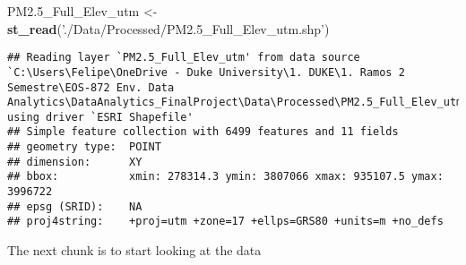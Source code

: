 \documentclass[12pt,]{article}
\newenvironment{Shaded}{\begin{snugshade}}{\end{snugshade}}
\newcommand{\KeywordTok}[1]{\textcolor[rgb]{0.13,0.29,0.53}{\textbf{#1}}}
\newcommand{\StringTok}[1]{\textcolor[rgb]{0.31,0.60,0.02}{#1}}
\newcommand{\NormalTok}[1]{#1}
\begin{document}
\begin{Shaded}
\begin{Highlighting}[]
\NormalTok{PM2.5_Full_Elev_utm <-}\StringTok{ }\KeywordTok{st_read}\NormalTok{(}\StringTok{'./Data/Processed/PM2.5_Full_Elev_utm.shp'}\NormalTok{) }
\end{Highlighting}
\end{Shaded}

\begin{verbatim}
## Reading layer `PM2.5_Full_Elev_utm' from data source `C:\Users\Felipe\OneDrive - Duke University\1. DUKE\1. Ramos 2 Semestre\EOS-872 Env. Data Analytics\DataAnalytics_FinalProject\Data\Processed\PM2.5_Full_Elev_utm.shp' using driver `ESRI Shapefile'
## Simple feature collection with 6499 features and 11 fields
## geometry type:  POINT
## dimension:      XY
## bbox:           xmin: 278314.3 ymin: 3807066 xmax: 935107.5 ymax: 3996722
## epsg (SRID):    NA
## proj4string:    +proj=utm +zone=17 +ellps=GRS80 +units=m +no_defs
\end{verbatim}

The next chunk is to start looking at the data
\end{document}
